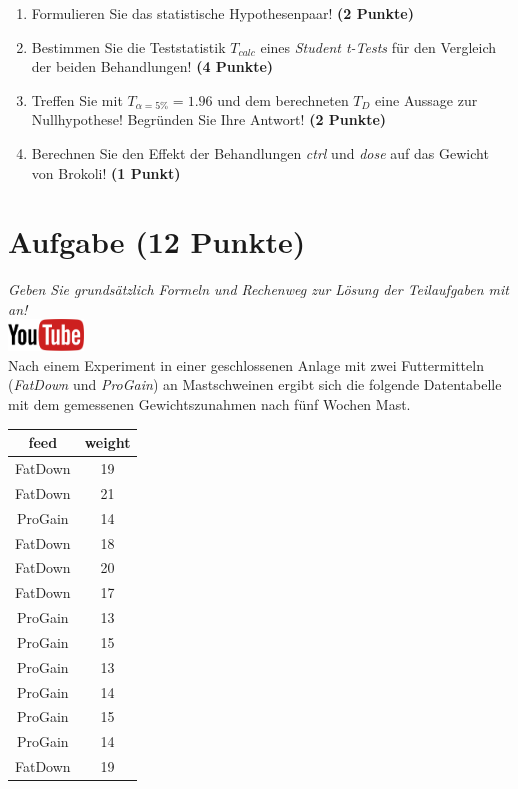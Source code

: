 \documentclass[a4paper, 9pt]{scrartcl}\usepackage[]{graphicx}\usepackage[]{xcolor}
\begin{document}
\begin{enumerate}
  \item Formulieren Sie das statistische Hypothesenpaar! \textbf{(2
      Punkte)}
  \item Bestimmen Sie die Teststatistik $T_{calc}$ eines
    \textit{Student t-Tests} f{\"u}r den Vergleich der beiden Behandlungen!
    \textbf{(4 Punkte)}
\item Treffen Sie mit $T_{\alpha = 5\%} = 1.96$ und dem
  berechneten $T_{D}$ eine Aussage zur Nullhypothese! Begr{\"u}nden Sie Ihre
  Antwort!  \textbf{(2 Punkte)}
\item Berechnen Sie den Effekt der Behandlungen \textit{ctrl} und
  \textit{dose} auf das Gewicht von Brokoli! \textbf{(1 Punkt)}
\end{enumerate} 
\clearpage

\section{Aufgabe \hfill (12 Punkte)}

\textit{Geben Sie grunds{\"a}tzlich Formeln und Rechenweg zur L{\"o}sung der
  Teilaufgaben mit an!} \\[1Ex]

\hfill\href{https://youtu.be/TbSEOMCQYl4}{\includegraphics[width =
  2cm]{img/youtube}}\\[1Ex]



Nach einem Experiment in einer geschlossenen Anlage mit zwei Futtermitteln (\textit{FatDown} und
\textit{ProGain}) an Mastschweinen ergibt sich die folgende Datentabelle
mit dem gemessenen Gewichtszunahmen nach f{\"u}nf Wochen Mast.

\begin{table}[!h]
\centering
\begin{tabular}{cc}
\toprule
feed & weight\\
\midrule
FatDown & 19\\
FatDown & 21\\
ProGain & 14\\
FatDown & 18\\
FatDown & 20\\
\addlinespace
FatDown & 17\\
ProGain & 13\\
ProGain & 15\\
ProGain & 13\\
ProGain & 14\\
\addlinespace
ProGain & 15\\
ProGain & 14\\
FatDown & 19\\
\bottomrule
\end{tabular}
\end{table}
\end{document}
